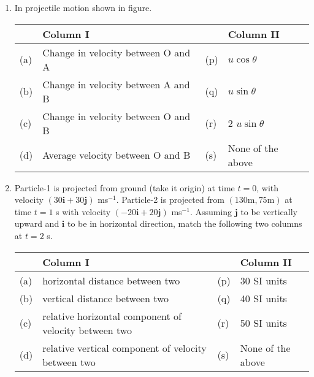 \documentclass{article}
\begin{document}
\begin{enumerate}
    \item In projectile motion shown in figure.
    \begin{center}
    \end{center}
    \begin{center}
        \renewcommand{\arraystretch}{2}
        \begin{table}[h]
            \centering
            \begin{tabular}{p{0.25cm}p{8cm}|p{0.25cm}p{5cm}}
            \hline
            & Column I & & Column II \\
            \hline
            (a) & Change in velocity between O and A & (p) & $u \cos \theta$ \\
            (b) & Change in velocity between A and B & (q) & $u \sin \theta$ \\
            (c) & Change in velocity between O and B & (r) & 2 $u \sin \theta$ \\
            (d) & Average velocity between O and B & (s) & None of the above \\
            \hline
            \end{tabular}
        \end{table}
    \end{center}

    \item Particle-1 is projected from ground (take it origin) at time $t = 0$, with velocity $(30\mathbf{i} + 30\mathbf{j})$ ms$^{-1}$. Particle-2 is projected from $(130 \text{m}, 75 \text{m})$ at time $t = 1$ s with velocity $(-20\mathbf{i} + 20\mathbf{j})$ ms$^{-1}$. Assuming $\mathbf{j}$ to be vertically upward and $\mathbf{i}$ to be in horizontal direction, match the following two columns at $t = 2$ s.
    \begin{center}
        \renewcommand{\arraystretch}{2}
        \begin{table}[h]
            \centering
            \begin{tabular}{p{0.25cm}p{8.5cm}|p{0.25cm}p{4.5cm}}
            \hline
            & Column I & & Column II \\
            \hline
            (a) & horizontal distance between two & (p) & 30 SI units \\
            (b) & vertical distance between two & (q) & 40 SI units \\
            (c) & relative horizontal component of velocity between two & (r) & 50 SI units \\
            (d) & relative vertical component of velocity between two & (s) & None of the above \\
            \hline
            \end{tabular}
        \end{table}
    \end{center}
    

\end{enumerate}
\end{document}
